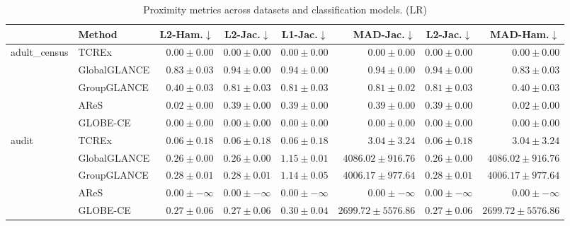 \begin{table}[ht]
\centering
\caption{Proximity metrics across datasets and classification models. (LR)}
\label{tab:proximity_metrics_multinomiallogisticregression}
\begin{center}
\begin{sc}
\begin{scriptsize}
\begin{tabular}{l|l|rrrrrr}
\toprule
 & Method & L2-Ham.$\downarrow$ & L2-Jac.$\downarrow$ & L1-Jac.$\downarrow$ & MAD-Jac.$\downarrow$ & L2-Jac.$\downarrow$ & MAD-Ham.$\downarrow$ \\
\midrule
\multirow{5}{*}{adult\_census} & TCREx & $\boldsymbol{0.00\pm{0.00}}$ & $\boldsymbol{0.00\pm{0.00}}$ & $\boldsymbol{0.00\pm{0.00}}$ & $\boldsymbol{0.00\pm{0.00}}$ & $\boldsymbol{0.00\pm{0.00}}$ & $\boldsymbol{0.00\pm{0.00}}$ \\
 & GlobalGLANCE & $0.83\pm{0.03}$ & $0.94\pm{0.00}$ & $0.94\pm{0.00}$ & $0.94\pm{0.00}$ & $0.94\pm{0.00}$ & $0.83\pm{0.03}$ \\
 & GroupGLANCE & $0.40\pm{0.03}$ & $0.81\pm{0.03}$ & $0.81\pm{0.03}$ & $0.81\pm{0.02}$ & $0.81\pm{0.03}$ & $0.40\pm{0.03}$ \\
 & AReS & $0.02\pm{0.00}$ & $0.39\pm{0.00}$ & $0.39\pm{0.00}$ & $0.39\pm{0.00}$ & $0.39\pm{0.00}$ & $0.02\pm{0.00}$ \\
 & GLOBE-CE & $\boldsymbol{0.00\pm{0.00}}$ & $\boldsymbol{0.00\pm{0.00}}$ & $\boldsymbol{0.00\pm{0.00}}$ & $\boldsymbol{0.00\pm{0.00}}$ & $\boldsymbol{0.00\pm{0.00}}$ & $\boldsymbol{0.00\pm{0.00}}$ \\
\midrule
\multirow{5}{*}{audit} & TCREx & $0.06\pm{0.18}$ & $0.06\pm{0.18}$ & $0.06\pm{0.18}$ & $3.04\pm{3.24}$ & $0.06\pm{0.18}$ & $3.04\pm{3.24}$ \\
 & GlobalGLANCE & $0.26\pm{0.00}$ & $0.26\pm{0.00}$ & $1.15\pm{0.01}$ & $4086.02\pm{916.76}$ & $0.26\pm{0.00}$ & $4086.02\pm{916.76}$ \\
 & GroupGLANCE & $0.28\pm{0.01}$ & $0.28\pm{0.01}$ & $1.14\pm{0.05}$ & $4006.17\pm{977.64}$ & $0.28\pm{0.01}$ & $4006.17\pm{977.64}$ \\
 & AReS & $\boldsymbol{0.00\pm{-\infty}}$ & $\boldsymbol{0.00\pm{-\infty}}$ & $\boldsymbol{0.00\pm{-\infty}}$ & $\boldsymbol{0.00\pm{-\infty}}$ & $\boldsymbol{0.00\pm{-\infty}}$ & $\boldsymbol{0.00\pm{-\infty}}$ \\
 & GLOBE-CE & $0.27\pm{0.06}$ & $0.27\pm{0.06}$ & $0.30\pm{0.04}$ & $2699.72\pm{5576.86}$ & $0.27\pm{0.06}$ & $2699.72\pm{5576.86}$ \\

\end{tabular}
\end{scriptsize}
\end{sc}
\end{center}
\end{table}
